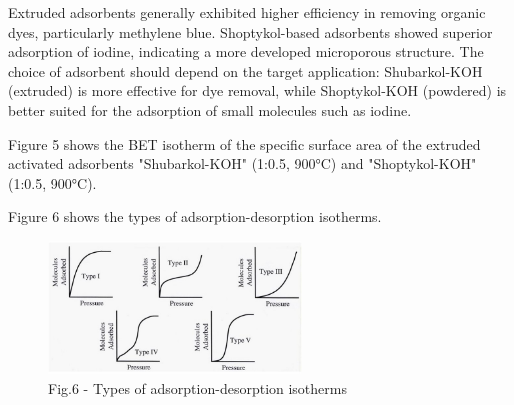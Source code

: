 \begin{multicols}{2}
Extruded adsorbents generally exhibited higher efficiency in removing
organic dyes, particularly methylene blue. Shoptykol-based adsorbents
showed superior adsorption of iodine, indicating a more developed
microporous structure. The choice of adsorbent should depend on the
target application: Shubarkol-KOH (extruded) is more effective for dye
removal, while Shoptykol-KOH (powdered) is better suited for the
adsorption of small molecules such as iodine.

Figure 5 shows the BET isotherm of the specific surface area of the
extruded activated adsorbents "Shubarkol-KOH" (1:0.5, 900°C) and
"Shoptykol-KOH" (1:0.5, 900°C).

Figure 6 shows the types of adsorption-desorption isotherms.
\end{multicols}

\begin{figure}[H]
	\centering
	\includegraphics[width=0.6\textwidth]{media/chem2/image23}
	\caption*{Fig.6 - Types of adsorption-desorption isotherms}
\end{figure}

